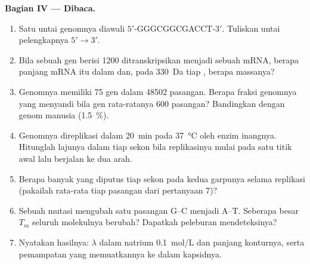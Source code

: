 \begin{problem}
\medskip
\noindent\textbf{Bagian IV --- Dibaca.}
\begin{enumerate}[resume]
  \item Satu untai genomnya diawali $5'$-GGGCGGCGACCT-$3'$. Tuliskan
        untai pelengkapnya $5' \to 3'$.
  \item Bila sebuah gen berisi \num{1200}  ditranskripsikan
        menjadi sebuah mRNA, berapa panjang mRNA itu dalam 
        dan, pada \qty{330}{Da} tiap , berapa massanya?
  \item Genomnya memiliki \qty{75}{} gen dalam \num{48502} pasangan.
        Berapa fraksi genomnya yang menyandi bila gen rata-ratanya
        \num{600} pasangan? Bandingkan dengan genom manusia
        (\qty{1.5}{\%}).
  \item Genomnya direplikasi dalam \qty{20}{min} pada
        \qty{37}{\celsius} oleh enzim inangnya. Hitunglah lajunya dalam
         tiap sekon bila replikasinya mulai pada satu titik
        awal lalu berjalan ke dua arah.
  \item Berapa banyak  yang diputus tiap sekon pada
        kedua garpunya selama replikasi (pakailah rata-rata tiap
        pasangan dari pertanyaan 7)?
  \item Sebuah mutasi mengubah satu pasangan G--C menjadi A--T.
        Seberapa besar $T_m$ seluruh molekulnya berubah? Dapatkah
        peleburan mendeteksinya?
  \item Nyatakan hasilnya:   $\lambda$ dalam natrium
        \qty{0.1}{mol/L} dan panjang konturnya, serta pemampatan yang
        memuatkannya ke dalam kapsidnya.
\end{enumerate}
\end{problem}
